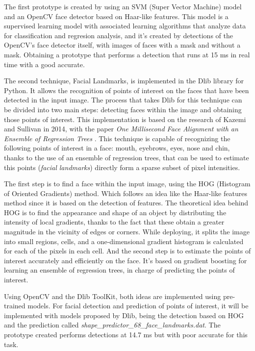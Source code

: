 The first prototype is created by using an SVM (Super Vector Machine) model and an OpenCV face detector based on Haar-like features. This model is a supervised learning model with associated learning algorithms that analyze data for classification and regresion analysis, and it's created by detections of the OpenCV's face detector itself, with images of faces with a mask and without a mask. Obtaining a prototype that performs a detection that runs at 15 ms in real time with a good accurate.

The second technique, Facial Landmarks, is implemented in the Dlib library for Python. It allows the recognition of points of interest on the faces that have been detected in the input image. The process that takes Dlib for this technique can be divided into two main steps: detecting faces within the image and obtaining those points of interest. This implementation is based on the research of Kazemi and Sullivan in 2014, with the paper \textit{One Millisecond Face Alignment with an Ensemble of Regression Trees} \cite{faceLandmark}. This technique is capable of recognizing the following points of interest in a face: mouth, eyebrows, eyes, nose and chin, thanks to the use of an ensemble of regression trees, that can be used to estimate this points (\textit{facial landmarks}) directly form a sparse subset of pixel intensities.

The first step is to find a face within the input image, using the HOG (Histogram of Oriented Gradients) method. Which follows an idea like the Haar-like features method since it is based on the detection of features. The theoretical idea behind HOG is to find the appearance and shape of an object by distributing the intensity of local gradients, thanks to the fact that these obtain a greater magnitude in the vicinity of edges or corners. While deploying, it splits the image into small regions, cells, and a one-dimensional gradient histogram is calculated for each of the pixels in each cell. And the second step is to estimate the points of interest accurately and efficiently on the face. It's based on gradient boosting for learning an ensemble of regression trees, in charge of predicting the points of interest. 

Using OpenCV and the Dlib ToolKit, both ideas are implemented using pre-trained models. For facial detection and prediction of points of interest, it will be implemented with models proposed by Dlib, being the detection based on HOG and the prediction called \textit{shape\_predictor\_68\_face\_landmarks.dat}. The prototype created performs detections at 14.7 ms but with poor accurate for this task. 

